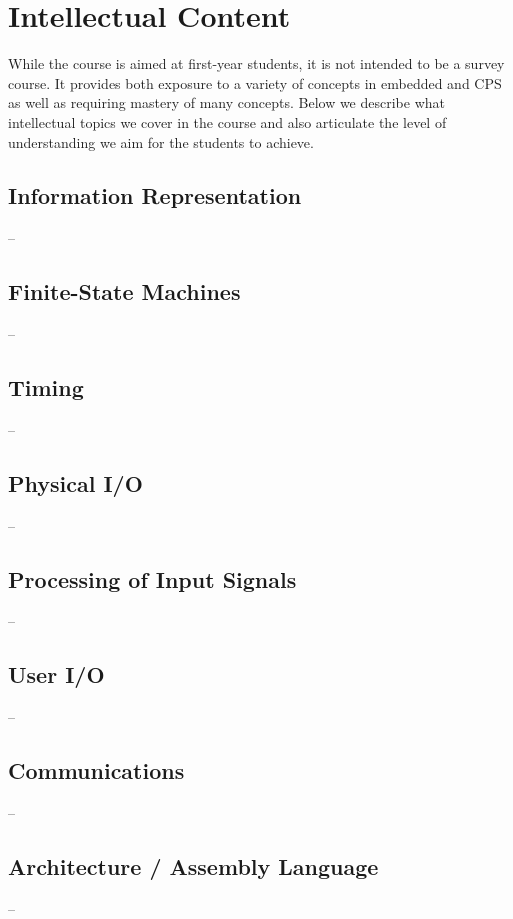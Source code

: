 \section{Intellectual Content}
\label{sec:topics}

While the course is aimed at first-year students, it is not intended to be a survey course.  It provides both exposure to a variety of concepts in embedded and CPS as well as requiring mastery of many concepts.  Below we describe what intellectual topics we cover in the course and also articulate the level of understanding we aim for the students to achieve.

\subsection{Information Representation} --
\label{sec:ip}

\subsection{Finite-State Machines} --
\label{sec:fsm}

\subsection{Timing} --
\label{sec:time}

\subsection{Physical I/O} --
\label{sec:pio}

\subsection{Processing of Input Signals} --
\label{sec:pis}

\subsection{User I/O} --
\label{sec:uio}

\subsection{Communications} --
\label{sec:comm}

\subsection{Architecture / Assembly Language} --
\label{sec:arch}



